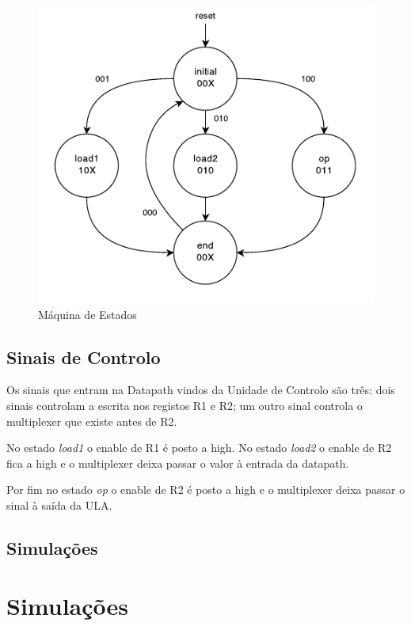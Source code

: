 \documentclass[a4paper]{article}
\begin{document}
\begin{figure}[h]
	\centering
	\includegraphics[scale=0.28]{FSM}
	\caption{Máquina de Estados}
	\label{fig:FSMdiagram}
\end{figure}

\subsection{Sinais de Controlo}
Os sinais que entram na Datapath vindos da Unidade de Controlo são três: dois sinais controlam a escrita nos registos R1 e R2; um outro sinal controla o multiplexer que existe antes de R2.

No estado \textit{load1} o enable de R1 é posto a high. No estado \textit{load2} o enable de R2 fica a high e o multiplexer deixa passar o valor à entrada da datapath.

Por fim no estado \textit{op} o enable de R2 é posto a high e o multiplexer deixa passar o sinal à saída da ULA.

\pagebreak
\subsection{Simulações}
\pagebreak


\section{Simulações}
\end{document}
